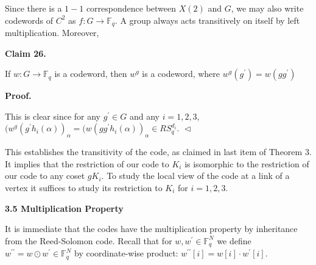 \documentclass[10pt,a4paper]{article}
\begin{document}
Since there is a $1-1$ correspondence between $X(2)$ and $G$, we may also write codewords of $C^{2}$ as $f:G\to\mathbb{F}_{q}$. A group always acts transitively on itself by left multiplication. Moreover,\par





\par\medskip\noindent\textbf{
Claim 26. 
}\par



If $w:G\to\mathbb{F}_{q}$ is a codeword, then $w^{g}$ is a codeword, where $w^{g}(g^{\prime})=w(gg^{\prime})$\par







\par\medskip\noindent\textbf{
\textbf{Proof}.}\par




This is clear since for any $g^{\prime}\in G$ and any $i=1,2,3$, $(w^{g}(g^{\prime}h_{i}(\alpha))_{\alpha}=(w(gg^{\prime}h_{i}(\alpha))_{\alpha}\in RS_{q}^{d_{i}}$.
$\vartriangleleft$\par




This establishes the transitivity of the code, as claimed in last item of Theorem 3. It implies that the restriction of our code to $K_{i}$ is isomorphic to the restriction of our code to any coset $gK_{i}$. To study the local view of the code at a link of a vertex it suffices to study its restriction to $K_{i}$ for $i=1,2,3$.\par






\par\medskip\noindent\textbf{
3.5 Multiplication Property}\par




It is immediate that the codes have the multiplication property by inheritance from the Reed-Solomon code. Recall that for $w,w^{\prime}\in\mathbb{F}_{q}^{N}$ we define $w^{\prime\prime}=w\odot w^{\prime}\in\mathbb{F}_{q}^{N}$ by coordinate-wise product: $w^{\prime\prime}[i]=w[i]\cdot w^{\prime}[i]$.\par
\end{document}
